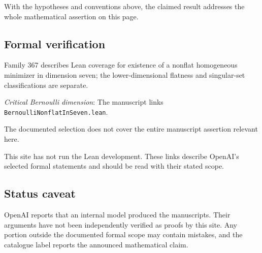 \documentclass[11pt]{article}
\begin{document}
With the hypotheses and conventions above, the claimed result addresses the whole mathematical assertion on this page.

\subsection{Formal verification}
Family 367 describes Lean coverage for existence of a nonflat homogeneous minimizer in dimension seven; the lower-dimensional flatness and singular-set classifications are separate.

\textit{Critical Bernoulli dimension}: The manuscript links \texttt{BernoulliNonflatInSeven.lean}.

The documented selection does not cover the entire manuscript assertion relevant here.

This site has not run the Lean development. These links describe OpenAI’s selected formal statements and should be read with their stated scope.

\subsection{Status caveat}
OpenAI reports that an internal model produced the manuscripts. Their arguments have not been independently verified as proofs by this site. Any portion outside the documented formal scope may contain mistakes, and the catalogue label reports the announced mathematical claim.
\end{document}
